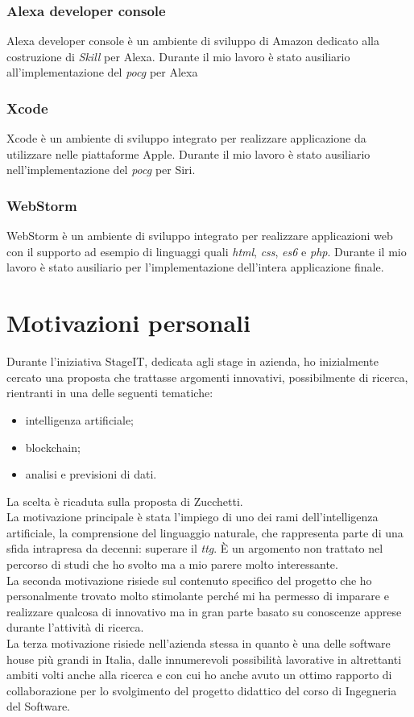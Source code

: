 		\subsubsection{Alexa developer console}
		Alexa developer console è un ambiente di sviluppo di Amazon dedicato alla costruzione di \emph{Skill} per Alexa. Durante il mio lavoro è stato ausiliario all'implementazione del \emph{\gls{pocg}} per Alexa
		\subsubsection{Xcode}
		Xcode è un ambiente di sviluppo integrato per realizzare applicazione da utilizzare nelle piattaforme Apple. Durante il mio lavoro è stato ausiliario nell'implementazione del \emph{\gls{pocg}} per Siri.
		\subsubsection{WebStorm}
		WebStorm è un ambiente di sviluppo integrato per realizzare applicazioni web con il supporto ad esempio di linguaggi quali \emph{\gls{html}}, \emph{\gls{css}}, \emph{\gls{es6}} e \emph{\gls{php}}\glsfirstoccur. Durante il mio lavoro è stato ausiliario per l'implementazione dell'intera applicazione finale.

\section{Motivazioni personali}
Durante l'iniziativa StageIT, dedicata agli stage in azienda, ho inizialmente cercato una proposta che trattasse argomenti innovativi, possibilmente di ricerca, rientranti in una delle seguenti tematiche:
\begin{itemize}
	\item intelligenza artificiale;
	\item blockchain;
	\item analisi e previsioni di dati.
\end{itemize}
La scelta è ricaduta sulla proposta di Zucchetti. \\
La motivazione principale è stata l'impiego di uno dei rami dell'intelligenza artificiale, la comprensione del linguaggio naturale, che rappresenta parte di una sfida intrapresa da decenni: superare il \emph{\gls{ttg}}\glsfirstoccur. È un argomento non trattato nel percorso di studi che ho svolto ma a mio parere molto interessante. \\
La seconda motivazione risiede sul contenuto specifico del progetto che ho personalmente trovato molto stimolante perché mi ha permesso di imparare e realizzare qualcosa di innovativo ma in gran parte basato su conoscenze apprese durante l'attività di ricerca. \\
La terza motivazione risiede nell'azienda stessa in quanto è una delle software house più grandi in Italia, dalle innumerevoli possibilità lavorative in altrettanti ambiti volti anche alla ricerca e con cui ho anche avuto un ottimo rapporto di collaborazione per lo svolgimento del progetto didattico del corso di Ingegneria del Software.